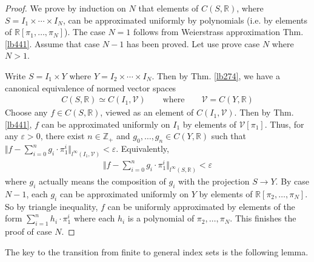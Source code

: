 \documentclass[12pt,b5paper,notitlepage]{article}
\theoremstyle{definition}
\theoremstyle{plain}
\newcommand{\mc}{\mathcal}
\newcommand{\Zbb}{\mathbb Z}
\newcommand{\Rbb}{\mathbb R}
\newcommand{\eps}{\varepsilon}
\numberwithin{equation}{section}
\begin{document}
\begin{proof}
We prove by induction on $N$ that elements of $C(S,\Rbb)$, where $S=I_1\times\cdots\times I_N$, can be approximated uniformly by polynomials (i.e. by elements of $\Rbb[\pi_1,\dots,\pi_N]$). The case $N=1$ follows from Weierstrass approximation Thm. \ref{lb441}. Assume that case $N-1$ has been proved. Let use prove case $N$ where $N>1$. 

Write $S=I_1\times Y$ where $Y=I_2\times\cdots\times I_N$. Then by Thm. \ref{lb274}, we have a canonical equivalence of normed vector spaces
\begin{align*}
C(S,\Rbb)\simeq C(I_1,\mc V)\qquad\text{where}\qquad\mc V=C(Y,\Rbb)
\end{align*}
Choose any $f\in C(S,\Rbb)$, viewed as an element of $C(I_1,\mc V)$. Then by Thm. \ref{lb441}, $f$ can be approximated uniformly on $I_1$ by elements of $\mc V[\pi_1]$. Thus, for any $\eps>0$, there exist $n\in\Zbb_+$ and $g_0,\dots,g_n\in C(Y,\Rbb)$ such that $\Vert f-\sum_{i=0}^n g_i\cdot\pi_1^i\Vert_{l^\infty(I_1,\mc V)}<\eps$. Equivalently,
\begin{align*}
\Big\Vert f-\sum_{i=0}^n g_i\cdot \pi_1^i\Big\Vert_{l^\infty(S,\Rbb)}<\eps
\end{align*}
where $g_i$ actually means the composition of $g_i$ with the projection $S\rightarrow Y$. By case $N-1$, each $g_i$ can be approximated uniformly on $Y$ by elements of $\Rbb[\pi_2,\dots,\pi_N]$. So by triangle inequality, $f$ can be uniformly approximated by elements of the form $\sum_{i=1}^n h_i\cdot\pi_1^i$ where each $h_i$ is a polynomial of $\pi_2,\dots,\pi_N$. This finishes the proof of case $N$.
\end{proof}



The key to the transition from finite to general index sets is the following lemma.
\end{document}
